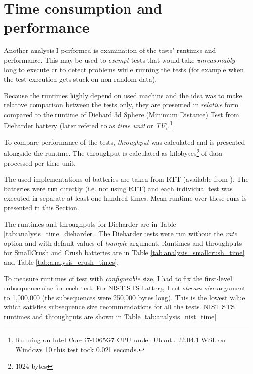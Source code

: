 \documentclass[
  digital,     %
  oneside,     %
  nosansbold,  %
  nocolorbold, %
  nolof,         %
  nolot,         %
]{fithesis4}
\begin{document}



\section{Time consumption and performance} \label{chap:analysis-times}


Another analysis I performed is examination of the tests' runtimes and performance. This may be used to \emph{exempt} tests that would take \emph{unreasonably} long to execute or to detect problems while running the tests (for example when the test execution gets stuck on non-random data).

Because the runtimes highly depend on used machine and the idea was to make relatove comparison between the tests only, they are presented in \emph{relative} form compared to the runtime of Diehard 3d Sphere (Minimum Distance) Test from Dieharder battery (later refered to as \emph{time unit} or \emph{TU}).\footnote{Running on Intel Core i7-1065G7 CPU under Ubuntu 22.04.1 WSL on Windows 10 this test took 0.021 seconds.} 

To compare performance of the tests, \emph{throughput} was calculated and is presented alongside the runtime. The throughput is calculated as kilobytes\footnote{1024 bytes} of data processed per time unit. 

The used implementations of batteries are taken from RTT (available from \cite{rtt-batteries}). The batteries were run directly (i.e. not using RTT) and each individual test was executed in separate at least one hundred times. Mean runtime over these runs is presented in this Section.

The runtimes and throughputs for Dieharder are in Table \ref{tab:analysis_time_dieharder}. The Dieharder tests were run without the \emph{rate} option and with default values of \emph{tsample} argument. Runtimes and throughputs for SmallCrush and Crush batteries are in Table \ref{tab:analysis_smallcrush_time} and Table \ref{tab:analysis_crush_times}.

To measure runtimes of test with \emph{configurable} size, I had to fix the first-level subsequence size for each test. For NIST STS battery, I set \emph{stream size} argument to 1,000,000 (the subsequences were 250,000  bytes long). This is the lowest value which satisfies subsequence size recommendations for all the tests. \cite{nist_special} NIST STS runtimes and throughputs are shown in Table \ref{tab:analysis_nist_time}.
\end{document}
